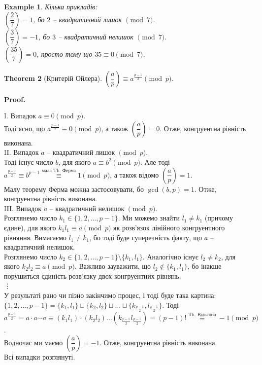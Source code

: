 \documentclass[a4paper, 10pt]{article}
\makeatletter
\theoremstyle{theoremdd}
\newtheorem{theorem}{Theorem}[subsection]
\theoremstyle{theoremdd}
\theoremstyle{theoremdd}
\theoremstyle{theoremdd}
\newtheorem{example}[theorem]{Example}
\theoremstyle{theoremdd}
\theoremstyle{theoremdd}
\theoremstyle{theoremdd}
\theoremstyle{theoremdd}
\renewenvironment{proof}[1][Proof.\\]{\par
\pushQED{\hfill \qed}%
\normalfont \topsep6\p@\@plus6\p@\relax
\trivlist
\item\relax
{\bfseries
#1\@addpunct{.}}\hspace\labelsep\ignorespaces
}{%
\popQED\endtrivlist\@endpefalse
}
\makeatother
\begin{document}
\begin{example} 
Кілька прикладів:\\
$\left( \dfrac{2}{7} \right) = 1$, бо $2$ -- квадратичний лишок $\!\! \pmod 7$.\\
$\left( \dfrac{3}{7} \right) = -1$, бо $3$ -- квадратичний нелишок $\!\! \pmod 7$.\\
$\left( \dfrac{35}{7} \right) = 0$, просто тому що $35 \equiv 0 \pmod 7$.
\end{example}

\begin{theorem}[Критерій Ойлера]
$\left( \dfrac{a}{p} \right) \equiv a^{\textstyle\frac{p-1}{2}} \pmod p$.
\end{theorem}

\begin{proof}
I. Випадок $a \equiv 0 \pmod p$.\\
Тоді ясно, що $a^{\frac{p-1}{2}} \equiv 0 \pmod p$, а також $\left( \dfrac{a}{p} \right) = 0$. Отже, конгруентна рівність виконана.
\bigskip \\
II. Випадок $a$ -- квадратичний лишок $\!\! \pmod p$.\\
Тоді існує число $b$, для якого $a \equiv b^2 \pmod p$. Але тоді \\ $a^{\frac{p-1}{2}} \equiv b^{p-1} \overset{\text{мала Th. Ферма}}{\equiv} 1 \pmod p$, а також відомо $\left( \dfrac{a}{p} \right) = 1$. \\
Малу теорему Ферма можна застосовувати, бо $\gcd(b,p) = 1$. Отже, конгруентна рівність виконана.
\bigskip \\
III. Випадок $a$ -- квадратичний нелишок $\!\! \pmod p$.\\
Розглянемо число $k_1 \in \{1,2,\dots,p-1\}$. Ми можемо знайти $l_1 \neq k_1$ (причому єдине), для якого $k_1 l_1 \equiv a \pmod p$ як розв'язок лінійного конгруентного рівняння. Вимагаємо $l_1 \neq k_1$, бо тоді буде суперечність факту, що $a$ -- квадратичний нелишок.\\
Розглянемо число $k_2 \in \{1,2,\dots,p-1\} \setminus \{k_1,l_1\}$. Аналогічно існує $l_2 \neq k_2$, для якого $k_2 l_2 \equiv a \pmod p$. Важливо зауважити, що $l_2 \not\in \{k_1,l_1\}$, бо інакше порушиться єдиність розв'язку двох конгруентних рівнянь.\\
\vdots \\
У результаті рано чи пізно закінчимо процес, і тоді буде така картина:\\
$\{1,2,\dots,p-1\} = \{k_1,l_1\} \sqcup \{k_2,l_2\} \sqcup \dots \sqcup \{k_{\frac{p-1}{2}},l_{\frac{p-1}{2}}\}$. Тоді\\
$a^{\frac{p-1}{2}} = a \cdot a \cdots a \equiv (k_1 l_1) \cdot (k_2 l_2) \dots (k_{\frac{p-1}{2}} l_{\frac{p-1}{2}}) = (p-1)! \overset{\text{Th. Вільсона}}{\equiv} -1 \pmod p$.\\
Водночас ми маємо $\left( \dfrac{a}{p} \right) = -1$. Отже, конгруентна рівність виконана.\\
Всі випадки розглянуті.
\end{proof}
\end{document}
